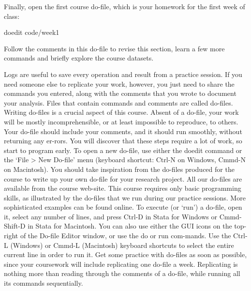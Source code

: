 \begin{description}
Finally, open the first course do-file, which is your homework for the first week of class:

\begin{docspec}
doedit code/week1
\end{docspec}

Follow the comments in this do-file to revise this section, learn a few more commands and briefly explore the course datasets.


Logs are useful to save every operation and result from a practice session. If you need someone else to replicate your work, however, you just need to share the commands you entered, along with the comments that you wrote to document your analysis. Files that contain commands and comments are called do-files.
Writing do-files is a crucial aspect of this course. Absent of a do-file, your work will be mostly incomprehensible, or at least impossible to reproduce, to others. Your do-file should include your comments, and it should run smoothly, without returning any er-rors. You will discover that these steps require a lot of work, so start to program early. To open a new do-file, use either the doedit command or the ‘File > New Do-file’ menu (keyboard shortcut: Ctrl-N on Windows, Cmmd-N on Macintosh).
You should take inspiration from the do-files produced for the course to write up your own do-file for your research project. All our do-files are available from the course web-site. This course requires only basic programming skills, as illustrated by the do-files that we run during our practice sessions. More sophisticated examples can be found online.
To execute (or ‘run’) a do-file, open it, select any number of lines, and press Ctrl-D in Stata for Windows or Cmmd-Shift-D in Stata for Macintosh. You can also use either the GUI icons on the top-right of the Do-file Editor window, or use the do or run com-mands. Use the Ctrl-L (Windows) or Cmmd-L (Macintosh) keyboard shortcuts to select the entire current line in order to run it.
Get some practice with do-files as soon as possible, since your coursework will include replicating one do-file a week. Replicating is nothing more than reading through the comments of a do-file, while running all its commands sequentially.

\end{description}
